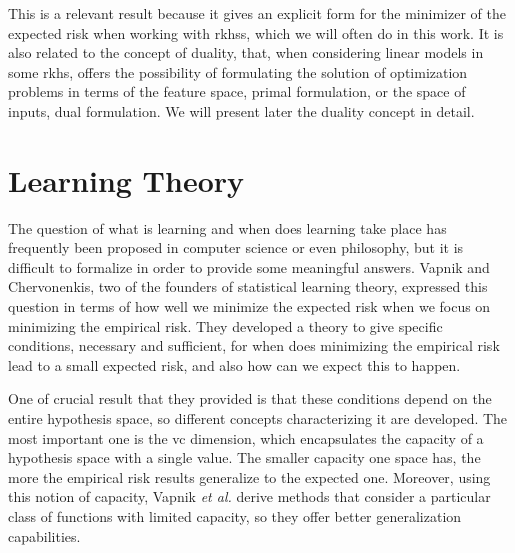 This is a relevant result because it gives an explicit form for the minimizer of the expected risk when working with \acrshort{rkhss}, which we will often do in this work. It is also related to the concept of duality, that, when considering linear models in some \acrshort{rkhs}, offers the possibility of formulating the solution of optimization problems in terms of the feature space, primal formulation, or the space of inputs, dual formulation. We will present later the duality concept in detail. 



















\section{Learning Theory}
% 
%




The question of what is learning and when does learning take place has frequently been proposed in computer science or even philosophy, but it is difficult to formalize in order to provide some meaningful answers. Vapnik and Chervonenkis, two of the founders of statistical learning theory, expressed this question in terms of how well we minimize the expected risk when we focus on minimizing the empirical risk.
%
They developed a theory to give specific conditions, necessary and sufficient, for when does minimizing the empirical risk lead to a small expected risk, and also how can we expect this to happen.

%
One of crucial result that they provided is that these conditions depend on the entire hypothesis space, so different concepts characterizing it are developed. The most important one is the \acrfull{vc} dimension, which encapsulates the capacity of a hypothesis space with a single value. The smaller capacity one space has, the more the empirical risk results generalize to the expected one.
%
Moreover, using this notion of capacity, Vapnik \emph{et al.} derive methods that consider a particular class of functions with limited capacity, so they offer better generalization capabilities.


